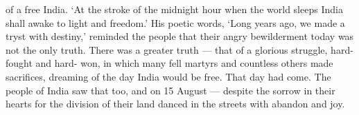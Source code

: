 of a free India. `At the stroke of the midnight hour when the world sleeps India shall awake to light and freedom.' His poetic words, `Long years ago, we made a tryst with destiny,' reminded the people that their angry bewilderment today was not the only truth. There was a greater truth --- that of a glorious struggle, hard-fought and hard- won, in which many fell martyrs and countless others made sacrifices, dreaming of the day India would be free. That day had come. The people of India saw that too, and on 15 August --- despite the sorrow in their hearts for the division of their land danced in the streets with abandon and joy.
